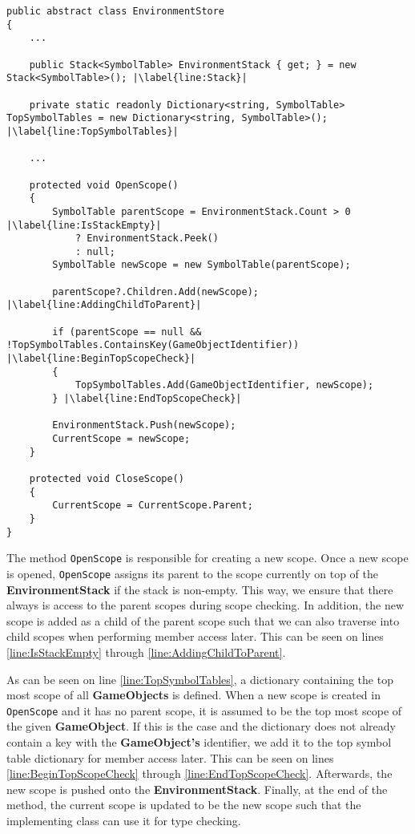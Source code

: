 \begin{lstlisting}[language=CSharp, caption={Abstract class SemanticAnalysis}, label={lst:ACSemanticAnalysis},escapechar=|]
public abstract class EnvironmentStore
{
    ...

    public Stack<SymbolTable> EnvironmentStack { get; } = new Stack<SymbolTable>(); |\label{line:Stack}|

    private static readonly Dictionary<string, SymbolTable> TopSymbolTables = new Dictionary<string, SymbolTable>(); |\label{line:TopSymbolTables}|

    ...

    protected void OpenScope()
    {
        SymbolTable parentScope = EnvironmentStack.Count > 0 |\label{line:IsStackEmpty}|
            ? EnvironmentStack.Peek() 
            : null;
        SymbolTable newScope = new SymbolTable(parentScope); 
        
        parentScope?.Children.Add(newScope); |\label{line:AddingChildToParent}|
        
        if (parentScope == null && !TopSymbolTables.ContainsKey(GameObjectIdentifier)) |\label{line:BeginTopScopeCheck}|
        {
            TopSymbolTables.Add(GameObjectIdentifier, newScope);
        } |\label{line:EndTopScopeCheck}|

        EnvironmentStack.Push(newScope);
        CurrentScope = newScope;
    }

    protected void CloseScope()
    {
        CurrentScope = CurrentScope.Parent;
    }
}
\end{lstlisting}

The method \texttt{OpenScope} is responsible for creating a new scope. Once a new scope is opened, \texttt{OpenScope} assigns its parent to the scope currently on top of the \textbf{EnvironmentStack} if the stack is non-empty. This way, we ensure that there always is access to the parent scopes during scope checking. 
In addition, the new scope is added as a child of the parent scope such that we can also traverse into child scopes when performing member access later. This can be seen on lines \ref{line:IsStackEmpty} through \ref{line:AddingChildToParent}.


As can be seen on line \ref{line:TopSymbolTables}, a dictionary containing the top most scope of all \textbf{GameObjects} is defined. When a new scope is created in \texttt{OpenScope} and it has no parent scope, it is assumed to be the top most scope of the given \textbf{GameObject}.
If this is the case and the dictionary does not already contain a key with the \textbf{GameObject's} identifier, we add it to the top symbol table dictionary for member access later. This can be seen on lines \ref{line:BeginTopScopeCheck} through \ref{line:EndTopScopeCheck}.
Afterwards, the new scope is pushed onto the \textbf{EnvironmentStack}. 
Finally, at the end of the method, the current scope is updated to be the new scope such that the implementing class can use it for type checking. 

